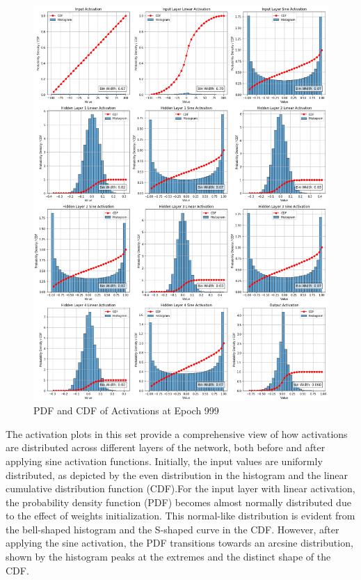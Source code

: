 \documentclass{ioereport}
\begin{document}
        \begin{figure}[H]
        \centering
        \includegraphics[width=\linewidth]{assets/audio histogram/epoch999activations.png}
        \caption{PDF and CDF of Activations at Epoch 999}
        \label{fig:audio-activation-999}
    \end{figure}

    The activation plots in this set provide a comprehensive view of how activations are distributed across different layers of the network, both before and after applying sine activation functions. Initially, the input values are uniformly distributed, as depicted by the even distribution in the histogram and the linear cumulative distribution function (CDF).For the input layer with linear activation, the probability density function (PDF) becomes almost normally distributed due to the effect of weights initialization. This normal-like distribution is evident from the bell-shaped histogram and the S-shaped curve in the CDF. However, after applying the sine activation, the PDF transitions towards an arcsine distribution, shown by the histogram peaks at the extremes and the distinct shape of the CDF.
\end{document}
